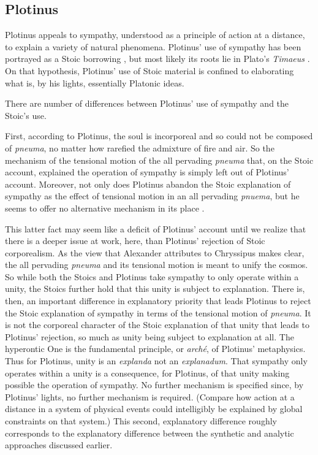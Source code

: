 
\subsection{Plotinus} %
\label{sec:plotinus}

Plotinus appeals to sympathy, understood as a principle of action at a distance, to explain a variety of natural phenomena. Plotinus' use of sympathy has been portrayed as a Stoic borrowing \citep{Emilsson:1988uq,Ierodiakonou:2006gf}, but most likely its roots lie in Plato's \emph{Timaeus} \citep{Emilsson:2015wf}. On that hypothesis, Plotinus' use of Stoic material is confined to elaborating what is, by his lights, essentially Platonic ideas.

There are number of differences between Plotinus' use of sympathy and the Stoic's use.

First, according to Plotinus, the soul is incorporeal and so could not be composed of \emph{pneuma}, no matter how rarefied the admixture of fire and air. So the mechanism of the tensional motion of the all pervading \emph{pneuma} that, on the Stoic account, explained the operation of sympathy is simply left out of Plotinus' account. Moreover, not only does Plotinus abandon the Stoic explanation of sympathy as the effect of tensional motion in an all pervading \emph{pnuema}, but he seems to offer no alternative mechanism in its place \citep[48]{Emilsson:1988uq}.

This latter fact may seem like a deficit of Plotinus' account until we realize that there is a deeper issue at work, here, than Plotinus' rejection of Stoic corporealism. As the view that Alexander attributes to Chryssipus makes clear, the all pervading \emph{pneuma} and its tensional motion is meant to unify the cosmos. So while both the Stoics and Plotinus take sympathy to only operate within a unity, the Stoics further hold that this unity is subject to explanation. There is, then, an important difference in explanatory priority that leads Plotinus to reject the Stoic explanation of sympathy in terms of the tensional motion of \emph{pneuma}. It is not the corporeal character of the Stoic explanation of that unity that leads to Plotinus' rejection, so much as unity being subject to explanation at all. The hyperontic One is the fundamental principle, or \emph{arch\'{e}}, of Plotinus' metaphysics. Thus for Plotinus, unity is an \emph{explanda} not an \emph{explanadum}. That sympathy only operates within a unity is a consequence, for Plotinus, of that unity making possible the operation of sympathy. No further mechanism is specified since, by Plotinus' lights, no further mechanism is required. (Compare how action at a distance in a system of physical events could intelligibly be explained by global constraints on that system.) This second, explanatory difference roughly corresponds to the explanatory difference between the synthetic and analytic approaches discussed earlier.

